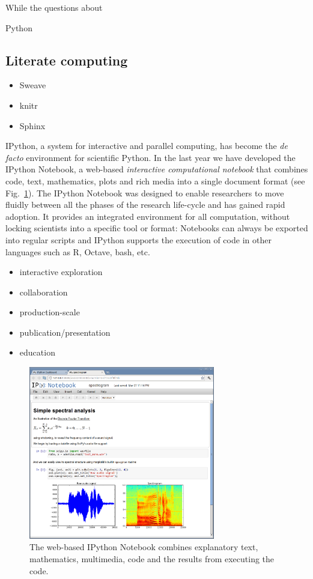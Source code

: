\documentclass[ChapterTOCs,krantz2]{krantz} %
\begin{document}
While the questions about

Python 

\subsection{Literate computing}

\begin{itemize}
\item Sweave
\item knitr
\item Sphinx
\end{itemize}


IPython, a system for interactive and parallel computing, has become the \emph{
  de facto} environment for scientific Python. In the last year we have
developed the IPython Notebook, a web-based \emph{ interactive computational
  notebook} that combines code, text, mathematics, plots and rich media into a
single document format (see Fig.~\ref{fig:IPython-notebook}).  The IPython
Notebook was designed to enable researchers to move fluidly between all the
phases of the research life-cycle and has gained rapid adoption. It provides an
integrated environment for all computation, without locking scientists into a
specific tool or format: Notebooks can always be exported into regular scripts
and IPython supports the execution of code in other languages such as R,
Octave, bash, etc.

\begin{itemize}

\item interactive exploration
\item collaboration
\item production-scale
\item publication/presentation \cite{brown2012single}
\item education
 
\end{itemize}
\begin{figure}
\begin{centering}
\includegraphics[width=3.2in]{fig/ipython-notebook-specgram.png}
\par\end{centering}

\caption{\label{fig:IPython-notebook}The web-based IPython Notebook combines
explanatory text, mathematics, multimedia, code and the results from
executing the code.}
\end{figure}
\end{document}
